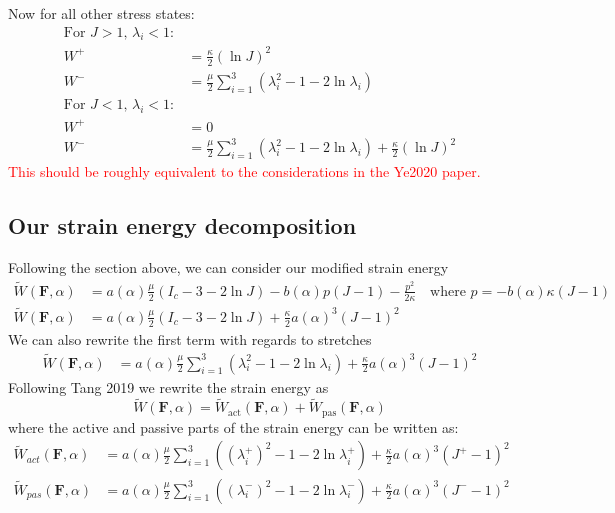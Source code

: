 \documentclass[12pt,3p]{article}
\numberwithin{equation}{section}
\begin{document}
Now for all other stress states:
\begin{align*}
\text{For } J > 1,\, \lambda_i < 1: &\\
W^+ &= \frac{\kappa}{2} (\ln J)^2 \\
W^- &= \frac{\mu}{2} \sum_{i = 1}^3 ( \lambda_i^2 - 1 - 2 \ln \lambda_i)\\
\text{For } J < 1,\, \lambda_i < 1: &\\
W^+ &= 0\\
W^- &= \frac{\mu}{2} \sum_{i = 1}^3 ( \lambda_i^2 - 1 - 2 \ln \lambda_i) + \frac{\kappa}{2} (\ln J)^2 
\end{align*} 
\textcolor{red}{This should be roughly equivalent to the considerations in the Ye2020 paper. }


\subsection{Our strain energy decomposition}
Following the section above, we can consider our modified strain energy 
\begin{align*}
\widetilde{W} (\mathbf{F}, \alpha) 
	&= a(\alpha) \frac{\mu}{2} (I_c - 3 - 2 \ln J) - b(\alpha) p (J-1) - \frac{p^2}{2 \kappa} \quad \text{where } p = - b(\alpha) \kappa (J-1) \\
\widetilde{W} (\mathbf{F}, \alpha) 
	&= a(\alpha) \frac{\mu}{2} (I_c - 3 - 2 \ln J) + \frac{\kappa}{2} a(\alpha)^3 (J-1)^2
\end{align*}
We can also rewrite the first term with regards to stretches
\begin{align*}
\widetilde{W} (\mathbf{F}, \alpha) &= a(\alpha) \frac{\mu}{2} \sum_{i = 1}^3 (\lambda_i^2 - 1 - 2 \ln \lambda_i) + \frac{\kappa}{2} a(\alpha)^3 (J-1)^2
\end{align*}
Following Tang 2019 we rewrite the strain energy as 
\begin{equation}
\widetilde{W} (\mathbf{F}, \alpha) = \widetilde{W}_\text{act} (\mathbf{F}, \alpha ) +\widetilde{W}_\text{pas} (\mathbf{F}, \alpha)
\end{equation}
where the active and passive parts of the strain energy can be written as: 
\begin{align*}
\widetilde{W}_{act} (\mathbf{F}, \alpha) &= a(\alpha) \frac{\mu}{2} \sum_{i = 1}^3 ( (\lambda_i^+)^2 - 1 - 2 \ln \lambda_i^+) + \frac{\kappa}{2} a(\alpha)^3 (J^+ -1)^2 \\
\widetilde{W}_{pas} (\mathbf{F}, \alpha) &= a(\alpha) \frac{\mu}{2} \sum_{i = 1}^3 ( (\lambda_i^-)^2 - 1 - 2 \ln \lambda_i^-) + \frac{\kappa}{2} a(\alpha)^3 (J^- -1)^2
\end{align*}
\end{document}
